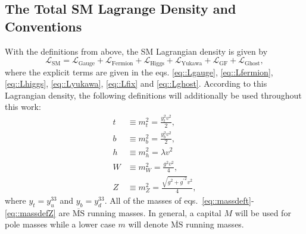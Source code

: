 \documentclass[a4paper,12pt]{book}
\begin{document}
\subsection{The Total SM Lagrange Density and Conventions}
With the definitions from above, the SM Lagrangian density is given by 
\begin{equation}
\mathcal{L}_\text{SM} = \mathcal{L}_\text{Gauge} + \mathcal{L}_\text{Fermion} + \mathcal{L}_\text{Higgs} + \mathcal{L}_\text{Yukawa} +\mathcal{L}_\text{GF} + \mathcal{L}_\text{Ghost},
\end{equation}
where the explicit terms are given in the eqs. \eqref{eq::Lgauge}, \eqref{eq::Lfermion}, \eqref{eq::Lhiggs}, \eqref{eq::Lyukawa}, \eqref{eq::Lfix} and \eqref{eq::Lghost}.
According to this Lagrangian density, the following definitions will additionally be used throughout this work: 
\begin{align}
\label{eq::massdeft}
t &\equiv m_t^2 = \frac{y_t^2 v^2}{2},\\
\label{eq::massdefb}
b &\equiv m_b^2 = \frac{y_b^2 v^2}{2},\\
\label{eq::massdefh}
h &\equiv m_h^2 = \lambda v^2\\
\label{eq::massdefW}
W &\equiv m_W^2 = \frac{g^2 v^2}{4},\\
\label{eq::massdefZ}
Z &\equiv m_Z^2 = \frac{\sqrt{g^2+{g^\prime}^2} v^2}{4},
\end{align}
where $y_t = y^{33}_u$ and $y_b = y^{33}_d$. All of the masses of eqs.\ \eqref{eq::massdeft}-\eqref{eq::massdefZ} are $\overline{\text{MS}}$ running masses. In general, a capital $M$ will be used for pole masses while a lower case $m$ will denote $\overline{\text{MS}}$ running masses.
\end{document}
